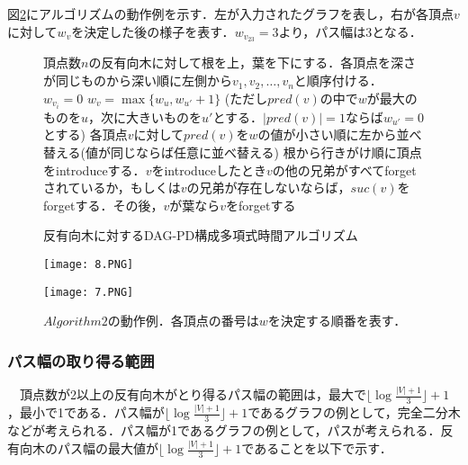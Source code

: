 \documentclass{kuisthesis}           %
\begin{document}
 図\ref{fig:6}にアルゴリズムの動作例を示す．左が入力されたグラフを表し，右が各頂点$v$に対して$w_v$を決定した後の様子を表す．$w_{v_{23}}=3$より，パス幅は3となる．
 

 
 \begin{figure}[!t]
 \begin{algorithm}[H]
    \caption{反有向木に対するDAG-PD構成多項式時間アルゴリズム}
    \label{alg2}
    \begin{algorithmic}[1]    %
    \State 頂点数$n$の反有向木に対して根を上，葉を下にする．各頂点を深さが同じものから深い順に左側から$v_1, v_2,   \ldots, v_n$と順序付ける．
    \State $w_{v_i} = 0$
    \Else
    \State $w_v= \max\{w_u, w_{u'}+1\}$ (ただし$pred(v)$の中で$w$が最大のものを$u$，次に大きいものを$u'$とする．$|pred(v)|=1$ならば$w_{u'}=0$とする)
    \EndIf
    \EndFor
    \State 各頂点$v$に対して$pred(v)$を$w$の値が小さい順に左から並べ替える(値が同じならば任意に並べ替える)
    \State 根から行きがけ順に頂点をintroduceする．$v$をintroduceしたとき$v$の他の兄弟がすべてforgetされているか，もしくは$v$の兄弟が存在しないならば，$suc(v)$をforgetする．その後，$v$が葉なら$v$をforgetする
    \end{algorithmic}
 \end{algorithm}
 \end{figure}


     
 
 \begin{figure}[htbp]
  \begin{minipage}[b]{.5\linewidth}
    \centering
    \texttt{[image: 8.PNG]}
  \end{minipage}%
  \begin{minipage}[b]{.5\linewidth}
    \centering
    \texttt{[image: 7.PNG]}
  \end{minipage}
  \caption{$Algorithm2$の動作例．各頂点の番号は$w$を決定する順番を表す．}
  \label{fig:6}
 \end{figure}


 \subsubsection{パス幅の取り得る範囲}

　頂点数が2以上の反有向木がとり得るパス幅の範囲は，最大で$\lfloor\log\frac{|V|+1}{3}\rfloor+1$，最小で1である．パス幅が$\lfloor\log\frac{|V|+1}{3}\rfloor+1$であるグラフの例として，完全二分木などが考えられる．パス幅が1であるグラフの例として，パスが考えられる．反有向木のパス幅の最大値が$\lfloor\log\frac{|V|+1}{3}\rfloor+1$であることを以下で示す．
\end{document}
